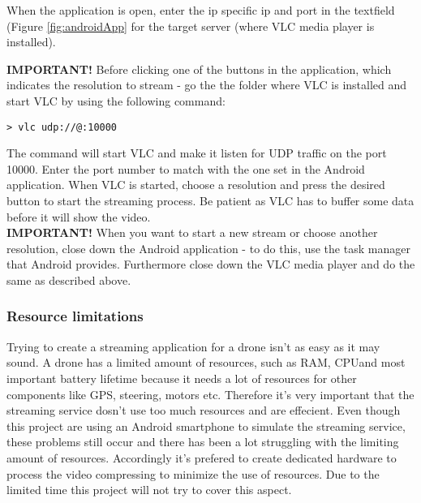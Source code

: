 
When the application is open, enter the ip specific ip and port in the textfield (Figure \ref{fig:androidApp} for the target server (where VLC media player is installed).


\textbf{IMPORTANT!} Before clicking one of the buttons in the application, which indicates the resolution to stream - go the the folder where VLC is installed and start VLC by using the following command:

\begin{verbatim}
> vlc udp://@:10000
\end{verbatim}

The command will start VLC and make it listen for UDP traffic on the port 10000. Enter the port number to match with the one set in the Android application.
When VLC is started, choose a resolution and press the desired button to start the streaming process. Be patient as VLC has to buffer some data before it will show the video.\\

\textbf{IMPORTANT!} When you want to start a new stream or choose another resolution, close down the Android application - to do this, use the task manager that Android provides. Furthermore close down the VLC media player and do the same as described above.

\subsubsection{Resource limitations}
Trying to create a streaming application for a drone isn't as easy as it may sound. A drone has a limited amount of resources, such as RAM, CPUand most important battery lifetime because it needs a lot of resources for other components like GPS, steering, motors etc. Therefore it's very important that the streaming service dosn't use too much resources and are effecient. Even though this project are using an Android smartphone to simulate the streaming service, these problems still occur and there has been a lot struggling with the limiting amount of resources. Accordingly it's prefered to create dedicated hardware to process the video compressing to minimize the use of resources. Due to the limited time this project will not try to cover this aspect.

